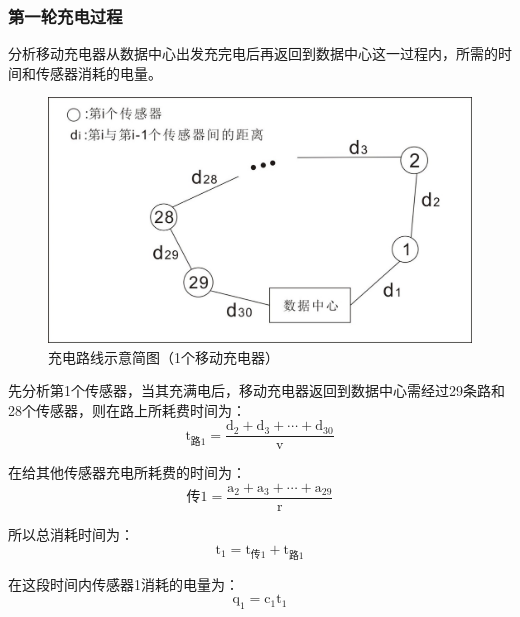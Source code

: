 \documentclass{article}
\begin{document}
\subsubsection{第一轮充电过程}
分析移动充电器从数据中心出发充完电后再返回到数据中心这一过程内，所需的时间和传感器消耗的电量\cite{ref5}。
\vspace{2ex}
\begin{figure}[htp]%
    \centering
    \includegraphics[scale=0.7]{8.jpg}
    \caption{充电路线示意简图（1个移动充电器）}
\end{figure}
\vspace{0.5ex}

先分析第1个传感器，当其充满电后，移动充电器返回到数据中心需经过29条路和28个传感器，则在路上所耗费时间为：
\begin{equation}
    \mathrm{t_{\text {路} 1}=\frac{d_{2}+d_{3}+\cdots+d_{30}}{v}}
    \tag{12}
\end{equation}

在给其他传感器充电所耗费的时间为：
\begin{equation}
    \mathrm{{\text {传} 1}=\frac{a_{2}+a_{3}+\cdots+a_{29}}{r}}
    \tag{13}
\end{equation}

所以总消耗时间为：
$$\mathrm{t_1=t_{\text {传1}}+t_{\text {路1}}}$$

在这段时间内传感器1消耗的电量为：
$$\mathrm{q_1=c_1 t_1}$$
\end{document}
